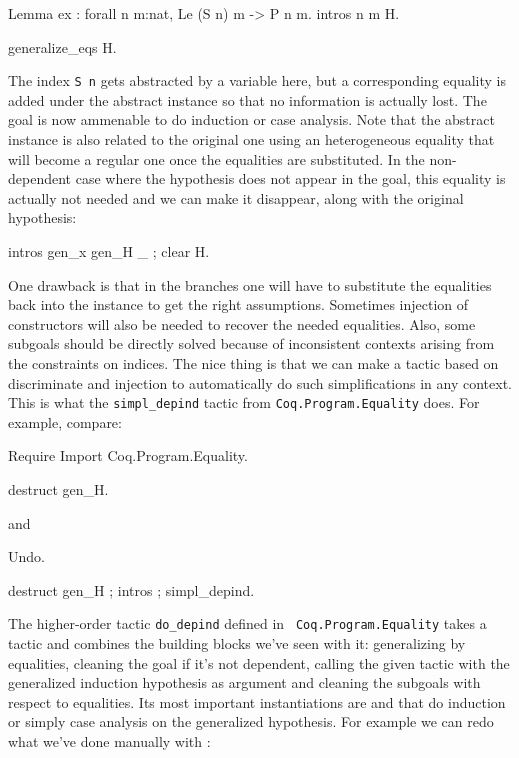 \begin{coq_example*}
\begin{coq_example*}
Lemma ex : forall n m:nat, Le (S n) m -> P n m.
intros n m H.
\end{coq_example*}
\begin{coq_example}
generalize_eqs H.
\end{coq_example}

The index {\tt S n} gets abstracted by a variable here, but a
corresponding equality is added under the abstract instance so that no
information is actually lost. The goal is now ammenable to do induction
or case analysis. Note that the abstract instance is also related to the
original one using an heterogeneous equality that will become a regular
one once the equalities are substituted. In the non-dependent case where
the hypothesis does not appear in the goal, this equality is actually
not needed and we can make it disappear, along with the original
hypothesis:

\begin{coq_example}
intros gen_x gen_H _ ; clear H.
\end{coq_example}

One drawback is that in the branches one will have to
substitute the equalities back into the instance to get the right
assumptions. Sometimes injection of constructors will also be needed to
recover the needed equalities. Also, some subgoals should be directly
solved because of inconsistent contexts arising from the constraints on 
 indices. The nice thing is that we can make a tactic based on
discriminate and injection to automatically do such simplifications in
any context. This is what the {\tt simpl\_depind} tactic from
{\tt Coq.Program.Equality} does. For example, compare:
\begin{coq_example*}
Require Import Coq.Program.Equality.
\end{coq_example*}
\begin{coq_example}
destruct gen_H.
\end{coq_example}
and
\begin{coq_eval}
Undo.
\end{coq_eval}
\begin{coq_example}
destruct gen_H ; intros ; simpl_depind.
\end{coq_example}

The higher-order tactic {\tt do\_depind} defined in {\tt
  Coq.Program.Equality} takes a tactic and combines the
building blocks we've seen with it: generalizing by equalities, cleaning
the goal if it's not dependent, calling the given tactic with the
generalized induction hypothesis as argument and cleaning the subgoals
with respect to equalities. Its most important instantiations are
\depind and \depdestr that do induction or simply case analysis on the
generalized hypothesis. For example we can redo what we've done manually
with \depdestr:


\end{coq_example*}
